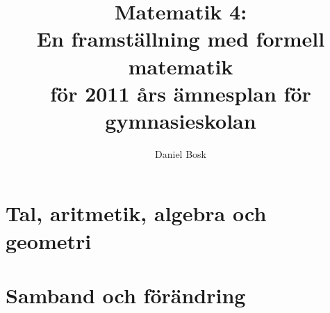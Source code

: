 \documentclass[a4paper,titlepage,reqno,final,twoside]{amsbook}
\theoremstyle{definition}
\theoremstyle{remark}
\numberwithin{section}{chapter}
\numberwithin{equation}{chapter}
\begin{document}

\title[Matematik 4]{
  Matematik 4:\\
  En framställning med formell matematik\\
  för 2011 års ämnesplan för gymnasieskolan
}
\author{Daniel Bosk}

\frontmatter



\mainmatter
\ifdraft{
  \doublespacing
}{}

\part{Tal, aritmetik, algebra och geometri}



\part{Samband och förändring}





\appendix
\ifdraft{
  \doublespacing
}{}
%

\backmatter
\ifdraft{
  \singlespacing
}{}


\clearpage
\end{document}
